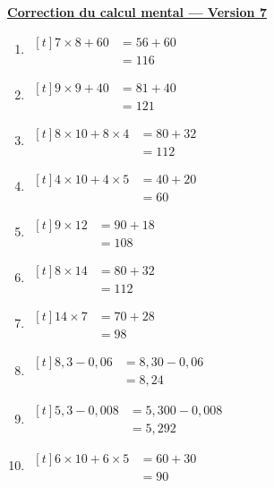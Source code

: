 \documentclass[12pt,a4paper]{article}
\newcommand{\titreversion}[1]{%
  \begin{center}%
    {\Large\underline{\textbf{#1}}}%
  \end{center}%
}
\begin{document}
\titreversion{Correction du calcul mental --- Version 7}
\begin{enumerate}
\item {$\begin{aligned}[t]
7\times 8+60 &= 56+60\\
             &= \boxed{116}
\end{aligned}$}
\item {$\begin{aligned}[t]
9\times 9+40 &= 81+40\\
             &= \boxed{121}
\end{aligned}$}
\item {$\begin{aligned}[t]
8\times 10+8\times 4 &= 80+32\\
                     &= \boxed{112}
\end{aligned}$}
\item {$\begin{aligned}[t]
4\times 10+4\times 5 &= 40+20\\
                     &= \boxed{60}
\end{aligned}$}
\item {$\begin{aligned}[t]
9\times 12 &= 90+18\\
           &= \boxed{108}
\end{aligned}$}
\item {$\begin{aligned}[t]
8\times 14 &= 80+32\\
           &= \boxed{112}
\end{aligned}$}
\item {$\begin{aligned}[t]
14\times 7 &= 70+28\\
           &= \boxed{98}
\end{aligned}$}
\item {$\begin{aligned}[t]
8{,}3-0{,}06 &= 8{,}30-0{,}06\\
             &= \boxed{8{,}24}
\end{aligned}$}
\item {$\begin{aligned}[t]
5{,}3-0{,}008 &= 5{,}300-0{,}008\\
              &= \boxed{5{,}292}
\end{aligned}$}
\item {$\begin{aligned}[t]
6\times 10+6\times 5 &= 60+30\\
                     &= \boxed{90}
\end{aligned}$}
\end{enumerate}
\newpage
\end{document}
